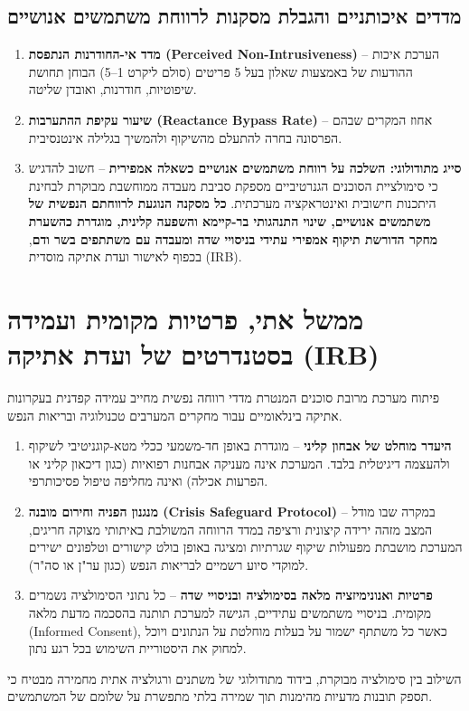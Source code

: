 \subsection{מדדים איכותניים והגבלת מסקנות לרווחת משתמשים אנושיים}
\begin{enumerate}
    \item \textbf{מדד אי-החודרנות הנתפסת (\textenglish{Perceived Non-Intrusiveness})} -- הערכת איכות ההודעות של \agentInterventionist{} באמצעות שאלון בעל 5 פריטים (סולם ליקרט 1--5) הבוחן תחושת שיפוטיות, חודרנות, ואובדן שליטה.
    \item \textbf{שיעור עקיפת ההתערבות (\textenglish{Reactance Bypass Rate})} -- אחוז המקרים שבהם הפרסונה בחרה להתעלם מהשיקוף ולהמשיך בגלילה אינטנסיבית.
    \item \textbf{סייג מתודולוגי: השלכה על רווחת משתמשים אנושיים כשאלה אמפירית} -- חשוב להדגיש כי סימולציית הסוכנים הגנרטיביים מספקת סביבת מעבדה ממוחשבת מבוקרת לבחינת היתכנות חישובית ואינטראקציה מערכתית. \textbf{כל מסקנה הנוגעת לרווחתם הנפשית של משתמשים אנושיים, שינוי התנהגותי בר-קיימא והשפעה קלינית, מוגדרת כהשערת מחקר הדורשת תיקוף אמפירי עתידי בניסויי שדה ומעבדה עם משתתפים בשר ודם}, בכפוף לאישור ועדת אתיקה מוסדית (\textenglish{IRB}).
\end{enumerate}

\section{ממשל אתי, פרטיות מקומית ועמידה בסטנדרטים של ועדת אתיקה (IRB)}
\label{sec:meth_ethics_irb}
פיתוח מערכת מרובת סוכנים המנטרת מדדי רווחה נפשית מחייב עמידה קפדנית בעקרונות אתיקה בינלאומיים עבור מחקרים המערבים טכנולוגיה ובריאות הנפש.

\begin{ethicsbox}
\begin{enumerate}
    \item \textbf{היעדר מוחלט של אבחון קליני} -- \projectname{} מוגדרת באופן חד-משמעי ככלי מטא-קוגניטיבי לשיקוף ולהעצמה דיגיטלית בלבד. המערכת אינה מעניקה אבחנות רפואיות (כגון דיכאון קליני או הפרעות אכילה) ואינה מחליפה טיפול פסיכותרפי.
    \item \textbf{מנגנון הפניה וחירום מובנה (\textenglish{Crisis Safeguard Protocol})} -- במקרה שבו מודל המצב מזהה ירידה קיצונית ורציפה במדד הרווחה המשולבת באיתותי מצוקה חריגים, המערכת מושבתת מפעולות שיקוף שגרתיות ומציגה באופן בולט קישורים וטלפונים ישירים למוקדי סיוע רשמיים לבריאות הנפש (כגון ער"ן או סה"ר).
    \item \textbf{פרטיות ואנונימיזציה מלאה בסימולציה ובניסויי שדה} -- כל נתוני הסימולציה נשמרים מקומית. בניסויי משתמשים עתידיים, הגישה למערכת תותנה בהסכמה מדעת מלאה (\textenglish{Informed Consent}), כאשר כל משתתף ישמור על בעלות מוחלטת על הנתונים ויוכל למחוק את היסטוריית השימוש בכל רגע נתון.
\end{enumerate}
\end{ethicsbox}

השילוב בין סימולציה מבוקרת, בידוד מתודולוגי של משתנים ורגולציה אתית מחמירה מבטיח כי \projectname{} תספק תובנות מדעיות מהימנות תוך שמירה בלתי מתפשרת על שלומם של המשתמשים.
